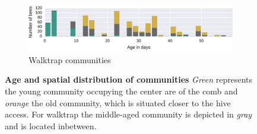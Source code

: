 \begin{figure}[!htb]
\begin{subfigure}[b]{1.0\textwidth}
	\end{subfigure}
	\begin{subfigure}[b]{1.0\textwidth}
	\centering
	\includegraphics[width=1.0\textwidth]{Figures/n3-ageDistribution-WT}
	\caption[Walktrap communities]{Walktrap communities}
	\label{fig:n3ageWT}
	\end{subfigure}
	\caption[Age and spatial distribution of communities]{\textbf{Age and spatial distribution of communities} \emph{Green} represents the young community occupying the center are of the comb and \emph{orange} the old community, which is situated closer to the hive access. For walktrap the middle-aged community is depicted in \emph{gray} and is located inbetween.}
	\label{fig:n3-communities}
\end{figure}